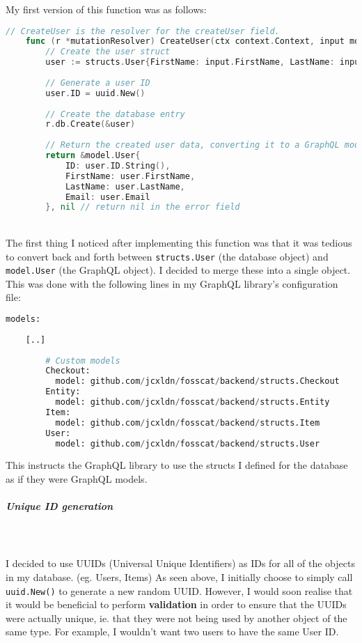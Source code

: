 \documentclass[../../main.tex]{subfiles}
\begin{document}
\noindent My first version of this function was as follows:

\begin{lstlisting}[language=Go]
    // CreateUser is the resolver for the createUser field.
    func (r *mutationResolver) CreateUser(ctx context.Context, input model.NewUser) (*model.User, error) {
        // Create the user struct
        user := structs.User{FirstName: input.FirstName, LastName: input.LastName, Email: input.Email}
        
        // Generate a user ID
        user.ID = uuid.New()
    
        // Create the database entry
        r.db.Create(&user)
    
        // Return the created user data, converting it to a GraphQL model.
        return &model.User{
            ID: user.ID.String(),
            FirstName: user.FirstName,
            LastName: user.LastName,
            Email: user.Email
        }, nil // return nil in the error field
    \end{lstlisting}

\noindent \\ The first thing I noticed after implementing this function was that it was tedious to convert back and forth between \lstinline{structs.User} (the database object) and \lstinline{model.User} (the GraphQL object). I decided to merge these into a single object. This was done with the following lines in my GraphQL library's configuration file:

\begin{lstlisting}[language=Python]
    models:
    
    [..]
    
        # Custom models
        Checkout:
          model: github.com/jcxldn/fosscat/backend/structs.Checkout
        Entity:
          model: github.com/jcxldn/fosscat/backend/structs.Entity
        Item:
          model: github.com/jcxldn/fosscat/backend/structs.Item
        User:
          model: github.com/jcxldn/fosscat/backend/structs.User
    \end{lstlisting}

This instructs the GraphQL library to use the structs I defined for the database as if they were GraphQL models.

\subparagraph{Unique ID generation}

\noindent \\\\ I decided to use UUIDs (Universal Unique Identifiers) as IDs for all of the objects in my database. (eg. Users, Items) As seen above, I initially choose to simply call \lstinline{uuid.New()} to generate a new random UUID. However, I would soon realise that it would be beneficial to perform \textbf{validation} in order to ensure that the UUIDs were actually unique, ie. that they were not being used by another object of the same type. For example, I wouldn't want two users to have the same User ID.
\end{document}
